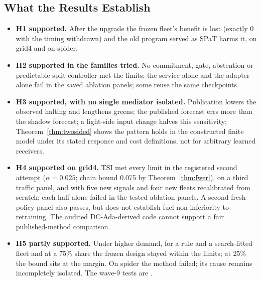 \subsection{What the Results Establish}
\begin{itemize}\setlength\itemsep{1pt}
\item \textbf{H1 supported.} After the upgrade the frozen fleet's benefit is lost (exactly 0 with the timing withdrawn) and the old program
served as SPaT harms it, on grid4 and on spider.
\item \textbf{H2 supported in the families tried.} No commitment, gate, abstention or predictable split controller met the limits; the
service alone and the adapter alone fail in the saved ablation panels; some reuse the same checkpoints.
\item \textbf{H3 supported, with no single mediator isolated.} Publication lowers the observed halting and lengthens greens; the published
forecast errs more than the shadow forecast; a light-side input change halves this sensitivity; Theorem~\ref{thm:twosided} shows the
pattern holds in the constructed finite model under its stated response and cost definitions, not for arbitrary learned receivers.
\item \textbf{H4 supported on grid4.} TSI met every limit in the registered second attempt ($\alpha=0.025$; chain bound 0.075 by
Theorem~\ref{thm:fwer}), on a third traffic panel, and with five new signals and four new fleets recalibrated from scratch; each half
alone failed in the tested ablation panels. A second fresh-policy panel also passes, but does not establish fuel non-inferiority to retraining. The audited DC-Ada-derived code cannot support a fair published-method comparison.
\item \textbf{H5 partly supported.} Under higher demand, for a rule and a search-fitted fleet and at a 75\% share the frozen design stayed
within the limits; at 25\% the bound sits at the margin. On spider the method failed; its cause remains incompletely isolated. The wave-9 tests are
.
\end{itemize}

